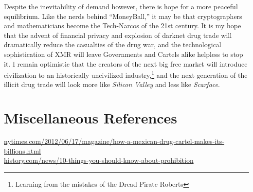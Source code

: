 \documentclass[12pt]{article}
\renewcommand{\footnotesize}{\scriptsize}
\begin{document}
Despite the inevitability of demand however, there is hope for a more peaceful equilibrium. Like the nerds behind ``MoneyBall,'' it may be that cryptographers and mathematicians become the Tech-Narcos of the 21st century. It is my hope that the advent of financial privacy and explosion of darknet drug trade will dramatically reduce the casualties of the drug war, and the technological sophistication of XMR will leave Governments and Cartels alike helpless to stop it.
I remain optimistic that the creators of the next big free market will introduce civilization to an historically uncivilized industry,\footnote{Learning from the mistakes of the Dread Pirate Roberts} and the next generation of the illicit drug trade will look more like \emph{Silicon Valley} and less like \emph{Scarface}. 


\clearpage













\pagebreak
\section{Miscellaneous References}
\footnotesize

\url{nytimes.com/2012/06/17/magazine/how-a-mexican-drug-cartel-makes-its-billions.html}\\

\url{history.com/news/10-things-you-should-know-about-prohibition}\\
\end{document}
